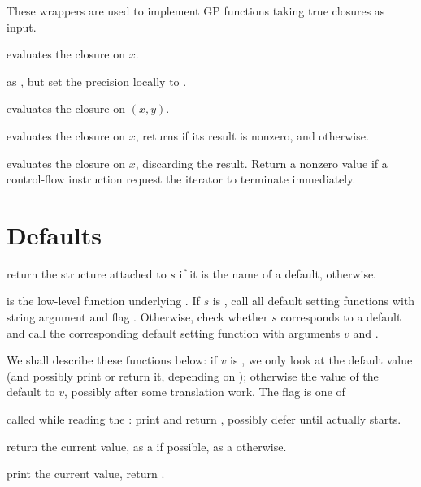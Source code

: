 These wrappers are used to implement GP functions taking true closures as
input.

 evaluates the closure  on $x$.

 as ,
but set the precision locally to .

 evaluates the closure 
on $(x,y)$.

 evaluates the closure  on
$x$, returns  if its result is nonzero, and  otherwise.

 evaluates the closure  on
$x$, discarding the result. Return a nonzero value if a control-flow
instruction request the iterator to terminate immediately.

\section{Defaults}

 return the 
structure attached to $s$ if it is the name of a default, 
otherwise.

 is the
low-level function underlying . If $s$ is , call all
default setting functions with string argument  and flag
. Otherwise, check whether $s$ corresponds to a default
and call the corresponding default setting function with arguments $v$ and
\fl.

We shall describe these functions below: if $v$ is , we only look
at the default value (and possibly print or return it, depending on
); otherwise the value of the default to $v$, possibly after some
translation work. The flag is one of

\item {} called while reading the : print and return
, possibly defer until  actually starts.

\item {} return the current value, as a  if possible, as
a  otherwise.

\item {} print the current value, return .

